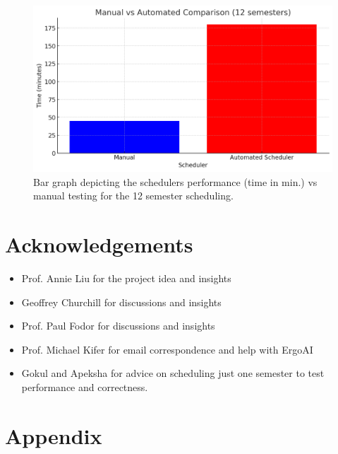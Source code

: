 \documentclass[12pt]{article}
\begin{document}
    \begin{figure}[h!]
        \centering
        \includegraphics[scale=0.5]{figures/eval/bar-graph-12sem.png}
        \caption{Bar graph depicting the schedulers performance (time in min.) vs manual testing for the 12 semester scheduling.}
        \label{fig:12sem}
    \end{figure}

    \newpage
    
    \section{Acknowledgements}
    \label{sec:ack}

    \begin{itemize}
        \item Prof. Annie Liu for the project idea and insights
        \item Geoffrey Churchill for discussions and insights
        \item Prof. Paul Fodor for discussions and insights
        \item Prof. Michael Kifer for email correspondence and help with ErgoAI
        \item Gokul and Apeksha for advice on scheduling just one semester to test performance and correctness.
    \end{itemize}
    
    \newpage
    
    
    
    

    \newpage
    
    \section{Appendix}
    \label{sec:appendix}
\end{document}
